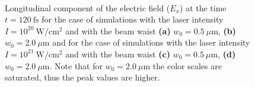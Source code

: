 \begin{figure}[h!]
	\centering
	\\[2mm]
	\caption{Longitudinal component of the electric field ($ E_{x} $) at the time  $ t = 120 \ \mathrm{fs} $ for the case of simulations with the laser intensity $ I = 10^{20} \ \mathrm{W/cm^2} $ and with the beam waist \textbf{(a)} $ w_0 = 0.5 \ \mu\mathrm{m} $, \textbf{(b)} $ w_0 = 2.0 \ \mu\mathrm{m} $ and for the case of simulations with the laser intensity $ I = 10^{21} \ \mathrm{W/cm^2} $ and with the beam waist \textbf{(c)} $ w_0 = 0.5 \ \mu\mathrm{m} $, \textbf{(d)} $ w_0 = 2.0 \ \mu\mathrm{m} $. Note that for $ w_0 = 2.0 \ \mu\mathrm{m} $ the color scales are saturated, thus the peak values are higher.}
	\label{fig:20}
\end{figure}

